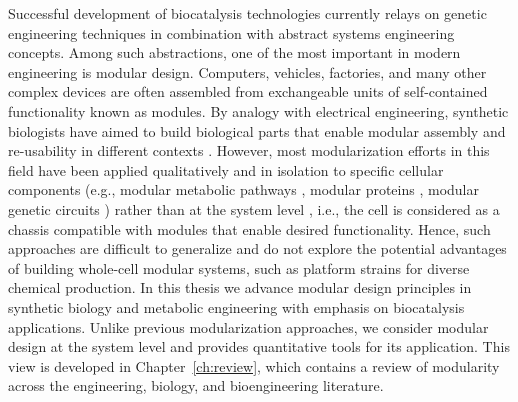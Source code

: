 Successful development of biocatalysis technologies currently relays on genetic engineering techniques in combination with abstract systems engineering concepts.
Among such abstractions, one of the most important in modern engineering is modular design.
Computers, vehicles, factories, and many other complex devices are often assembled from exchangeable units of self-contained functionality known as modules.
By analogy with electrical engineering, synthetic biologists have aimed to build biological parts that enable modular assembly and re-usability in different contexts \citep{shetty2008}.
However, most modularization efforts in this field have been applied qualitatively and in isolation to specific cellular components (e.g., modular metabolic pathways \citep{biggs2014}, modular proteins \citep{maervoet2017}, modular genetic circuits \citep{slusarczyk2012}) rather than at the system level \citep{purnick2009}, i.e., the cell is considered as a chassis compatible with modules that enable desired functionality. %
Hence, such approaches are difficult to generalize and do not explore the potential advantages of building whole-cell modular systems, such as platform strains \citep{nielsen2016} for diverse chemical production.
In this thesis we advance modular design principles in synthetic biology and metabolic engineering with emphasis on biocatalysis applications.
Unlike previous modularization approaches, we consider modular design at the system level and provides quantitative tools for its application.
This view is developed in Chapter~\ref{ch:review}, which contains a review of modularity across the engineering, biology, and bioengineering literature.


